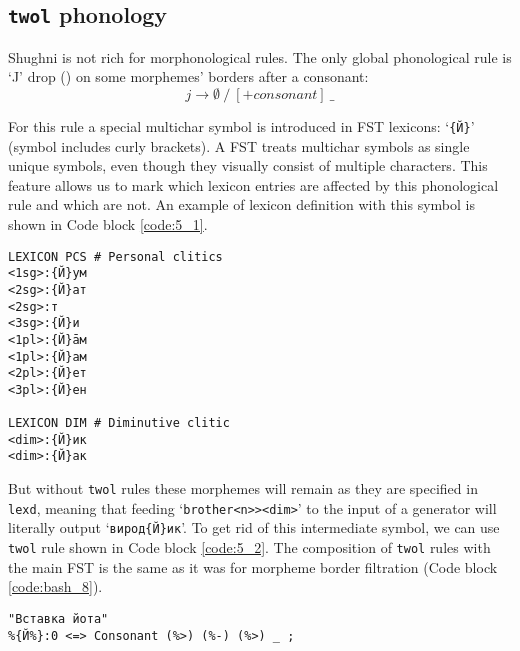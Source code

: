 \subsection{\texttt{twol} phonology}
Shughni is not rich for morphonological rules. The only global phonological rule is `J' drop () on some morphemes' borders after a consonant:
\[
j \rightarrow \emptyset 
\ /\ 
[+consonant]
\ \_
\]

For this rule a special multichar symbol is introduced in FST lexicons: `\texttt{\{Й\}}' (symbol includes curly brackets). A FST treats multichar symbols as single unique symbols, even though they visually consist of multiple characters. This feature allows us to mark which lexicon entries are affected by this phonological rule and which are not. An example of lexicon definition with this symbol is shown in Code block \ref{code:5_1}.

\begin{code_frame}[float]
    \begin{verbatim}
LEXICON PCS # Personal clitics
<1sg>:{Й}ум
<2sg>:{Й}ат
<2sg>:т
<3sg>:{Й}и
<1pl>:{Й}āм
<1pl>:{Й}ам
<2pl>:{Й}ет
<3pl>:{Й}ен

LEXICON DIM # Diminutive clitic
<dim>:{Й}ик
<dim>:{Й}ак
    \end{verbatim}
    \tcblower
    \label{code:5_1}
\end{code_frame}

But without \texttt{twol} rules these morphemes will remain as they are specified in \texttt{lexd}, meaning that feeding `\texttt{brother<n>><dim>}' to the input of a generator will literally output `\texttt{вирод\{Й\}ик}'. To get rid of this intermediate symbol, we can use \texttt{twol} rule shown in Code block \ref{code:5_2}. The composition of \texttt{twol} rules with the main FST is the same as it was for morpheme border filtration (Code block \ref{code:bash_8}). 

\begin{code_frame}[float]
    \begin{verbatim}
"Вставка йота"
%{Й%}:0 <=> Consonant (%>) (%-) (%>) _ ;
    \end{verbatim}
    \tcblower
    \label{code:5_2}
\end{code_frame}


